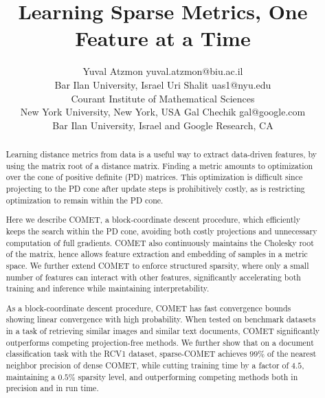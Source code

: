 \documentclass[twoside,11pt]{article}
\begin{document}
\title{Learning Sparse Metrics, One Feature at a Time}


\author{\name Yuval Atzmon \email yuval.atzmon@biu.ac.il \\
       \addr Bar Ilan University, Israel
       \AND
       \name Uri Shalit \email uas1@nyu.edu \\
       \addr Courant Institute of Mathematical Sciences \\
       New York University, New York, USA
       \AND
      \name Gal Chechik \email gal@google.com \\
       \addr Bar Ilan University, Israel and Google Research, CA}
\editor{ }

\maketitle
\vskip -15pt
\begin{abstract}%

Learning distance metrics from data is a useful way to extract data-driven features, by using the matrix root of a distance matrix. Finding a metric amounts to optimization over the cone of positive definite (PD) matrices. This optimization is difficult since projecting to the PD cone after update steps is prohibitively costly, as is restricting optimization to remain within the PD cone.

Here we describe COMET, a block-coordinate descent procedure, which efficiently keeps the search within the PD cone, avoiding both costly projections and unnecessary computation of full gradients. COMET also continuously maintains the Cholesky root of the matrix, hence allows feature extraction and embedding of samples in a metric space. We further extend COMET to enforce structured sparsity, where only a small number of features can interact with other features, significantly accelerating both training and inference while maintaining interpretability. 
 
As a block-coordinate descent procedure, COMET has fast convergence bounds showing linear convergence with high probability. When tested on benchmark datasets in a task of retrieving similar images and similar text documents, COMET significantly outperforms competing projection-free methods. We further show that on a document classification task with the RCV1 dataset, sparse-COMET achieves $99\%$ of the nearest neighbor precision of dense COMET, while cutting training time by a factor of $4.5$, maintaining a $0.5\%$ sparsity level, and outperforming competing methods both in precision and in run time. 
\end{abstract}
\end{document}
